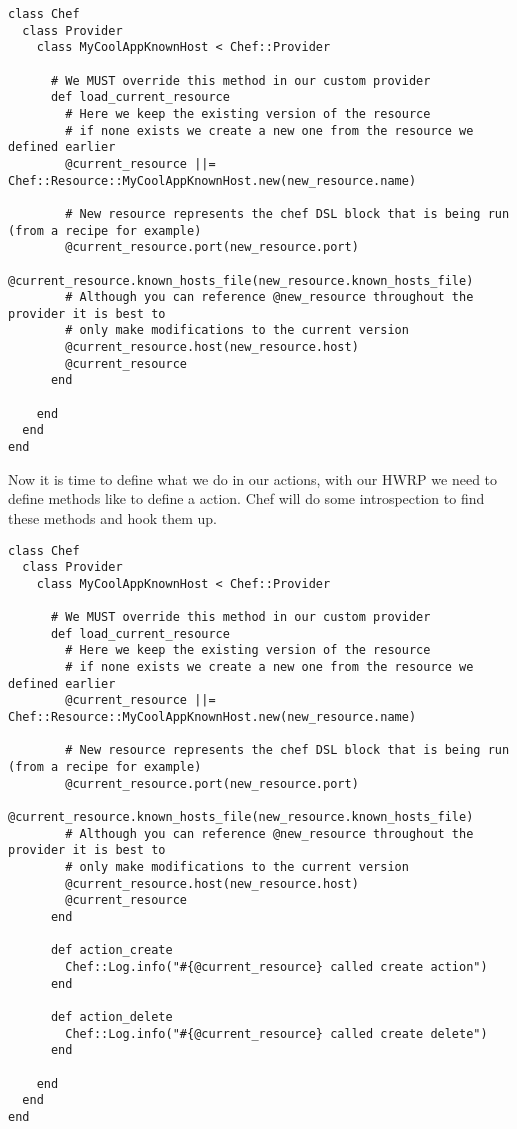 \begin{lstlisting}[label=lst:cookbook-hwrp4]
class Chef
  class Provider
    class MyCoolAppKnownHost < Chef::Provider

      # We MUST override this method in our custom provider
      def load_current_resource
        # Here we keep the existing version of the resource
        # if none exists we create a new one from the resource we defined earlier
        @current_resource ||= Chef::Resource::MyCoolAppKnownHost.new(new_resource.name)

        # New resource represents the chef DSL block that is being run (from a recipe for example)
        @current_resource.port(new_resource.port)
        @current_resource.known_hosts_file(new_resource.known_hosts_file)
        # Although you can reference @new_resource throughout the provider it is best to
        # only make modifications to the current version
        @current_resource.host(new_resource.host)
        @current_resource
      end

    end
  end
end
\end{lstlisting}

Now it is time to define what we do in our actions, with our HWRP we need to define methods like  to define a  action. Chef will do some introspection to find these methods and hook them up.

\begin{lstlisting}[label=lst:cookbook-hwrp5]
class Chef
  class Provider
    class MyCoolAppKnownHost < Chef::Provider

      # We MUST override this method in our custom provider
      def load_current_resource
        # Here we keep the existing version of the resource
        # if none exists we create a new one from the resource we defined earlier
        @current_resource ||= Chef::Resource::MyCoolAppKnownHost.new(new_resource.name)

        # New resource represents the chef DSL block that is being run (from a recipe for example)
        @current_resource.port(new_resource.port)
        @current_resource.known_hosts_file(new_resource.known_hosts_file)
        # Although you can reference @new_resource throughout the provider it is best to
        # only make modifications to the current version
        @current_resource.host(new_resource.host)
        @current_resource
      end

      def action_create
        Chef::Log.info("#{@current_resource} called create action")
      end

      def action_delete
        Chef::Log.info("#{@current_resource} called create delete")
      end

    end
  end
end
\end{lstlisting}

